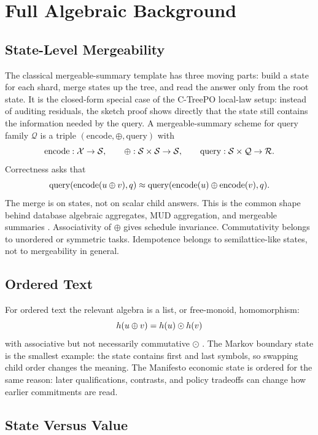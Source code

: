 \section{Full Algebraic Background}\label{app:min-algebra}

\subsection{State-Level Mergeability}

The classical mergeable-summary template has three moving parts: build a
state for each shard, merge states up the tree, and read the answer only from
the root state. It is the closed-form special case of the C-TreePO local-law
setup: instead of auditing residuals, the sketch proof shows directly that the
state still contains the information needed by the query. A
mergeable-summary scheme for query family $\mathcal{Q}$ is a triple
$(\mathrm{encode},\oplus,\mathrm{query})$ with
\[
\mathrm{encode}:\mathcal{X}\to\mathcal{S},\qquad
\oplus:\mathcal{S}\times\mathcal{S}\to\mathcal{S},\qquad
\mathrm{query}:\mathcal{S}\times\mathcal{Q}\to\mathcal{R}.
\]
Correctness asks that
\[
\mathrm{query}(\mathrm{encode}(u\oplus v),q)
\approx
\mathrm{query}(\mathrm{encode}(u)\oplus\mathrm{encode}(v),q).
\]
The merge is on states, not on scalar child answers.
This is the common shape behind database algebraic aggregates, MUD
aggregation, and mergeable summaries
\citep{GrayEtAl1997DataCube,FeldmanEtAl2008MUD,Agarwal2013MergeableTODS}.
Associativity of $\oplus$ gives schedule invariance. Commutativity belongs to
unordered or symmetric tasks. Idempotence belongs to semilattice-like states,
not to mergeability in general.

\subsection{Ordered Text}

For ordered text the relevant algebra is a list, or free-monoid,
homomorphism:
\[
h(u\oplus v)=h(u)\odot h(v)
\]
with associative but not necessarily commutative $\odot$
\citep{Gibbons1996ThirdHomomorphism}. The Markov boundary state is the
smallest example: the state contains first and last symbols, so swapping child
order changes the meaning. The Manifesto economic state is ordered for the
same reason: later qualifications, contrasts, and policy tradeoffs can change
how earlier commitments are read.

\subsection{State Versus Value}

